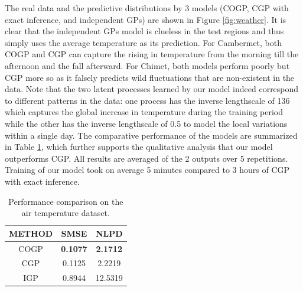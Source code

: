 The real data and the predictive distributions by 3 models (COGP, CGP with exact inference, and independent GPs) are shown in Figure \ref{fig:weather}.
It is clear that the independent GPs model is clueless in the test regions and thus simply uses the average temperature as its prediction.
For Cambermet, both COGP and CGP can capture the rising in temperature from the morning till the afternoon and the fall afterward.
For Chimet, both models perform poorly but CGP more so as it falsely predicts  wild fluctuations that are non-existent in the data. 
Note that the two latent processes learned by our model indeed correspond to different patterns in the data: one process has the inverse lengthscale of 136 which captures the global increase in temperature during the training period while the other has the inverse lengthscale of 0.5 to model the local variations within a single day.
The comparative performance of the models are summarized in Table \ref{tab:air}, which further supports the qualitative analysis that our model outperforms CGP.
All results are averaged of the 2 outputs over 5 repetitions.
Training of our model took on average 5 minutes compared to 3 hours of CGP with exact inference.

\begin{table}[h]
\caption{Performance comparison on the air temperature dataset.}
\label{tab:air}
\begin{center}
\begin{tabular}{c|c|c}
METHOD & SMSE & NLPD \\ \hline
COGP & \textbf{0.1077} & \textbf{2.1712} \\
CGP & 0.1125 & 2.2219 \\
IGP & 0.8944 & 12.5319
\end{tabular}
\end{center}
\end{table}


